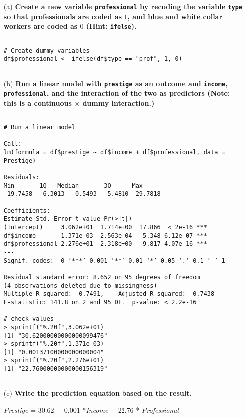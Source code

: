 \documentclass[12pt,letterpaper]{article}
\begin{document}
\newpage
\begin{enumerate}
	
	\item [(a)]
\textbf{	Create a new variable \texttt{professional} by recoding the variable \texttt{type} so that professionals are coded as $1$, and blue and white collar workers are coded as $0$ (Hint: \texttt{ifelse}).}
	
	\begin{verbatim}
		
# Create dummy variables 
df$professional <- ifelse(df$type == "prof", 1, 0)
		
	\end{verbatim}
	
	\item [(b)]
\textbf{	Run a linear model with \texttt{prestige} as an outcome and \texttt{income}, \texttt{professional}, and the interaction of the two as predictors (Note: this is a continuous $\times$ dummy interaction.)}
	
	\begin{verbatim}

# Run a linear model

Call:
lm(formula = df$prestige ~ df$income + df$professional, data = Prestige)

Residuals:
Min       1Q   Median       3Q      Max 
-19.7458  -6.3013  -0.5493   5.4810  29.7818 

Coefficients:
Estimate Std. Error t value Pr(>|t|)    
(Intercept)     3.062e+01  1.714e+00  17.866  < 2e-16 ***
df$income       1.371e-03  2.563e-04   5.348 6.12e-07 ***
df$professional 2.276e+01  2.318e+00   9.817 4.07e-16 ***
---
Signif. codes:  0 ‘***’ 0.001 ‘**’ 0.01 ‘*’ 0.05 ‘.’ 0.1 ‘ ’ 1

Residual standard error: 8.652 on 95 degrees of freedom
(4 observations deleted due to missingness)
Multiple R-squared:  0.7491,	Adjusted R-squared:  0.7438 
F-statistic: 141.8 on 2 and 95 DF,  p-value: < 2.2e-16

# check values
> sprintf("%.20f",3.062e+01)
[1] "30.62000000000000099476"
> sprintf("%.20f",1.371e-03)
[1] "0.00137100000000000004"
> sprintf("%.20f",2.276e+01)
[1] "22.76000000000000156319"
		
	\end{verbatim}
	
	
	\item [(c)]
\textbf{	Write the prediction equation based on the result.\\}
	
	\textit{Prestige} = 30.62 + 0.001 *\textit{Income} + 22.76 * \textit{Professional} \\
	

\end{enumerate}
\end{document}

